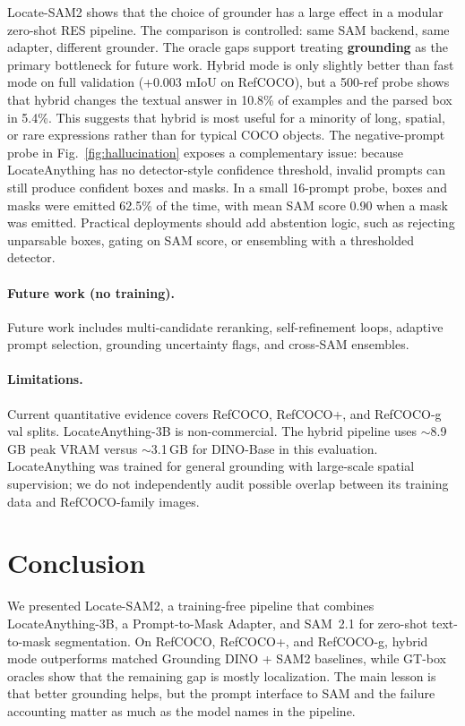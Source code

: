 \documentclass[11pt,a4paper]{article}
\begin{document}
Locate-SAM2 shows that the choice of grounder has a large effect in a modular zero-shot RES pipeline.
The comparison is controlled: same SAM backend, same adapter, different grounder.
The oracle gaps support treating \textbf{grounding} as the primary bottleneck for future work.
Hybrid mode is only slightly better than fast mode on full validation (+0.003 mIoU on RefCOCO), but a 500-ref probe shows that hybrid changes the textual answer in 10.8\% of examples and the parsed box in 5.4\%.
This suggests that hybrid is most useful for a minority of long, spatial, or rare expressions rather than for typical COCO objects.
The negative-prompt probe in Fig.~\ref{fig:hallucination} exposes a complementary issue: because LocateAnything has no detector-style confidence threshold, invalid prompts can still produce confident boxes and masks.
In a small 16-prompt probe, boxes and masks were emitted 62.5\% of the time, with mean SAM score 0.90 when a mask was emitted.
Practical deployments should add abstention logic, such as rejecting unparsable boxes, gating on SAM score, or ensembling with a thresholded detector.

\paragraph{Future work (no training).}
Future work includes multi-candidate reranking, self-refinement loops, adaptive prompt selection, grounding uncertainty flags, and cross-SAM ensembles.

\paragraph{Limitations.}
Current quantitative evidence covers RefCOCO, RefCOCO+, and RefCOCO-g val splits.
LocateAnything-3B is non-commercial.
The hybrid pipeline uses $\sim$8.9\,GB peak VRAM versus $\sim$3.1\,GB for DINO-Base in this evaluation.
LocateAnything was trained for general grounding with large-scale spatial supervision; we do not independently audit possible overlap between its training data and RefCOCO-family images.

\section{Conclusion}
\label{sec:conclusion}

We presented Locate-SAM2, a training-free pipeline that combines LocateAnything-3B, a Prompt-to-Mask Adapter, and SAM~2.1 for zero-shot text-to-mask segmentation.
On RefCOCO, RefCOCO+, and RefCOCO-g, hybrid mode outperforms matched Grounding DINO + SAM2 baselines, while GT-box oracles show that the remaining gap is mostly localization.
The main lesson is that better grounding helps, but the prompt interface to SAM and the failure accounting matter as much as the model names in the pipeline.
\end{document}
